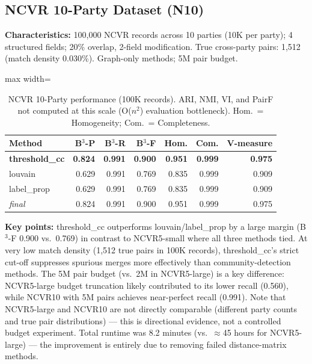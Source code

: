 \documentclass[11pt, a4paper]{article}
\begin{document}
\subsection{NCVR 10-Party Dataset (N10)}

\textbf{Characteristics:} 100,000 NCVR records across 10 parties (10K per party);
4 structured fields; 20\% overlap, 2-field modification. True cross-party pairs:
1,512 (match density 0.030\%). Graph-only methods; 5M pair budget.

\begin{table}[h!]
\centering
\small
\begin{adjustbox}{max width=\linewidth}
\begin{tabular}{lrrrrrr}
\toprule
\textbf{Method} & \textbf{B$^3$-P} & \textbf{B$^3$-R} & \textbf{B$^3$-F} &
\textbf{Hom.} & \textbf{Com.} & \textbf{V-measure} \\
\midrule
\textbf{threshold\_cc} & \textbf{0.824} & \textbf{0.991} & \textbf{0.900} & \textbf{0.951} & \textbf{0.999} & \textbf{0.975} \\
louvain               & 0.629 & 0.991 & 0.769 & 0.835 & 0.999 & 0.909 \\
label\_prop           & 0.629 & 0.991 & 0.769 & 0.835 & 0.999 & 0.909 \\
\midrule
\textit{final}        & 0.824 & 0.991 & 0.900 & 0.951 & 0.999 & 0.975 \\
\bottomrule
\end{tabular}
\end{adjustbox}
\caption{NCVR 10-Party performance (100K records). ARI, NMI, VI, and PairF not computed
at this scale (O($n^2$) evaluation bottleneck). Hom.\ = Homogeneity; Com.\ = Completeness.}
\end{table}

\textbf{Key points:} threshold\_cc outperforms louvain/label\_prop by a large margin
(B$^3$-F 0.900 vs.\ 0.769) in contrast to NCVR5-small where all three methods tied.
At very low match density (1,512 true pairs in 100K records), threshold\_cc's strict
cut-off suppresses spurious merges more effectively than community-detection methods.
The 5M pair budget (vs.\ 2M in NCVR5-large) is a key difference: NCVR5-large budget
truncation likely contributed to its lower recall (0.560), while NCVR10 with 5M pairs
achieves near-perfect recall (0.991). Note that NCVR5-large and NCVR10 are not directly
comparable (different party counts and true pair distributions) --- this is directional
evidence, not a controlled budget experiment.
Total runtime was 8.2 minutes (vs.\ $\approx$45 hours for NCVR5-large) --- the
improvement is entirely due to removing failed distance-matrix methods.
\end{document}
